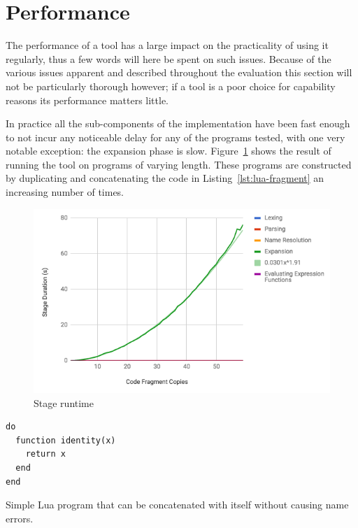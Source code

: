 \documentclass{kththesis}
\begin{document}
\section{Performance} \label{sec:performance}

The performance of a tool has a large impact on the practicality of using it regularly, thus a few words will here be spent on such issues. Because of the various issues apparent and described throughout the evaluation this section will not be particularly thorough however; if a tool is a poor choice for capability reasons its performance matters little.

In practice all the sub-components of the implementation have been fast enough to not incur any noticeable delay for any of the programs tested, with one very notable exception: the expansion phase is slow. Figure~\ref{fig:performance-graph-with-expansion} shows the result of running the tool on programs of varying length. These programs are constructed by duplicating and concatenating the code in Listing~\ref{lst:lua-fragment} an increasing number of times.

\begin{figure}[h]
\includegraphics[width=\textwidth]{resources/performance-graph-with-expansion}
\caption{Stage runtime}
\label{fig:performance-graph-with-expansion}
\end{figure}

\begin{listing}[h]
\begin{verbatim}
do
  function identity(x)
    return x
  end
end
\end{verbatim}
\caption{Simple Lua program that can be concatenated with itself without causing name errors.}
\label{lst:lua-fragment}
\end{listing}
\end{document}
